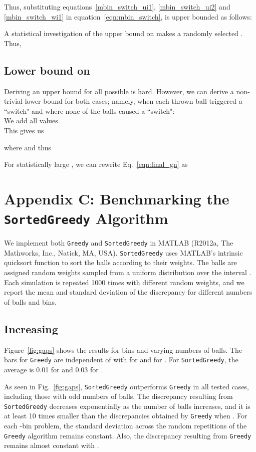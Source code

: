 \documentclass[12pt,psfig,a4]{article}
\newcommand{\sg}{\texttt{SortedGreedy}}
\newcommand{\gr}{\texttt{Greedy}}
\theoremstyle{plain}
\begin{document}
Thus, substituting equations~\ref{mbin_switch_ui1}, \ref{mbin_switch_ui2} and \ref{mbin_switch_wi1} in equation~\ref{eqn:mbin_switch},  is upper bounded as follows:


A statistical investigation of the upper bound on  makes a randomly selected . Thus,
 

\subsection{Lower bound on }
 Deriving an upper bound for all possible  is hard. However, we can derive a non-trivial lower bound for both cases; namely, when each thrown ball triggered a ``switch" and where none of the balls caused a ``switch": \\


 
We add all  values. \\

This gives us 


 
 where  and thus
  
 
For statistically large , we can rewrite Eq.~\ref{eqn:final_gn} as
 

\section{Appendix C: Benchmarking the \sg{} Algorithm}

We implement both \gr{} and \sg{} in MATLAB (R2012a, The Mathworks, Inc., Natick, MA, USA). \sg{} uses MATLAB's intrinsic quicksort function to sort the balls according to their weights. The balls are assigned random weights sampled from a uniform distribution over the interval . Each simulation is repeated 1000 times with different random weights, and we report the mean and standard deviation  of the discrepancy for different numbers of balls and bins. 

\subsection{Increasing }

Figure~\ref{fig:gaps} shows the results for  bins and varying numbers of balls. The  bars for \gr{} are independent of  with  for  and  for . For \sg{}, the average  is 0.01 for  and 0.03 for . 

As seen in Fig.~\ref{fig:gaps}, \sg{} outperforms \gr{} in all tested cases, including those with odd numbers of balls. The discrepancy resulting from \sg{} decreases exponentially as the number of balls increases, and it is at least 10 times smaller than the discrepancies obtained by \gr{} when . For each -bin problem, the standard deviation across the random repetitions of the \gr{} algorithm remains constant. Also, the discrepancy resulting from \gr{} remains almost constant with . 
\end{document}
